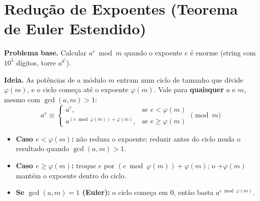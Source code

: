 \section{Redução de Expoentes (Teorema de Euler Estendido)}

\textbf{Problema base.} Calcular $a^e \bmod m$ quando o expoente $e$ é enorme (string com $10^5$ dígitos, torre $a^{b^c}$).

\textbf{Ideia.} As potências de $a$ módulo $m$ entram num ciclo de tamanho que divide $\varphi(m)$, e o ciclo começa
até o expoente $\varphi(m)$. Vale para \textbf{quaisquer} $a$ e $m$, mesmo com $\gcd(a, m) > 1$:
\[
\boxed{a^e \equiv \begin{cases}
  a^e, & \text{se } e < \varphi(m) \\[2pt]
  a^{(e \bmod \varphi(m)) + \varphi(m)}, & \text{se } e \ge \varphi(m)
\end{cases} \pmod m}
\]

\begin{itemize}
  \item \textbf{Caso $e < \varphi(m)$:} não reduza o expoente; reduzir antes do ciclo muda o resultado quando $\gcd(a, m) > 1$.
  \item \textbf{Caso $e \ge \varphi(m)$:} troque $e$ por $(e \bmod \varphi(m)) + \varphi(m)$; o $+\varphi(m)$ mantém o expoente dentro do ciclo.
  \item \textbf{Se $\gcd(a, m) = 1$ (Euler):} o ciclo começa em $0$, então basta $a^{e \bmod \varphi(m)}$.
\end{itemize}
